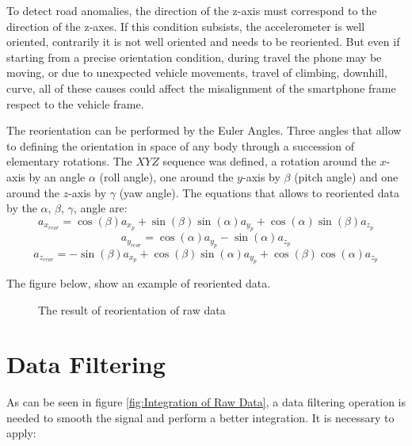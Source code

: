 \documentclass[tesi]{subfiles}
\begin{document}
To detect road anomalies, the direction of the z-axis must correspond to the direction of the z-axes. If this condition subsists, the accelerometer is well oriented, contrarily it is not well oriented and needs to be reoriented. But even if starting from a precise orientation condition, during travel the phone may be moving, or due to unexpected vehicle movements, travel of climbing, downhill, curve, all of these causes could affect the misalignment of the smartphone frame respect to the vehicle frame.

The reorientation can be performed by the Euler Angles. Three angles that allow to defining the orientation in space of any body through a succession of elementary rotations\cite{diebel2006representing}.
The $XYZ$ sequence was defined, a rotation around the $x$-axis by an angle $\alpha$ (roll angle), one around the $y$-axis by $\beta$ (pitch angle) and one around the $z$-axis by  $\gamma$ (yaw angle).
\noindent The equations that allows to reoriented data by the $\alpha$, $\beta$, $\gamma$, angle are:\cite{Andro}
\begin{equation}
a_{x_{reor}} = \cos (\beta) a_{x_{p}} + \sin (\beta) \sin (\alpha) a_{y_{p}} + \cos (\alpha) \sin (\beta) a_{z_{p}} 
\end{equation}
\begin{equation}
a_{y_{reor}} = \cos (\alpha) a_{y_{p}} - \sin (\alpha) a_{z_{p}}
\end{equation}
\begin{equation}
a_{z_{reor}} = -\sin (\beta) a_{x_{p}} + \cos (\beta) \sin (\alpha) a_{y_{p}} + \cos (\beta) \cos (\alpha) a_{z_{p}}
\end{equation}


\noindent The figure below, show an example of reoriented data.
\begin{figure}[H]
  \centering
  

 
  \caption{The result of reorientation of raw data}
  \label{fig:Accelerometer Reoriented}
\end{figure}

\section{Data Filtering} \label{sc:Data Filtering}
As can be seen in figure \ref{fig:Integration of Raw Data}, a data filtering operation is needed to smooth the signal and perform a better integration.
It is necessary to apply:
\end{document}
